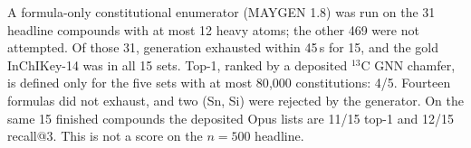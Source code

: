 A formula-only constitutional enumerator (MAYGEN 1.8) was run on the
31 headline compounds with at most 12 heavy atoms; the other 469 were
not attempted.
Of those 31, generation exhausted within 45\,s for 15, and the gold
InChIKey-14 was in all 15 sets.
Top-1, ranked by a deposited $^{13}$C GNN chamfer, is defined only for
the five sets with at most 80{,}000 constitutions: 4/5.
Fourteen formulas did not exhaust, and two (Sn, Si) were rejected by
the generator.
On the same 15 finished compounds the deposited Opus lists are 11/15
top-1 and 12/15 recall@3.
This is not a score on the $n{=}500$ headline.
